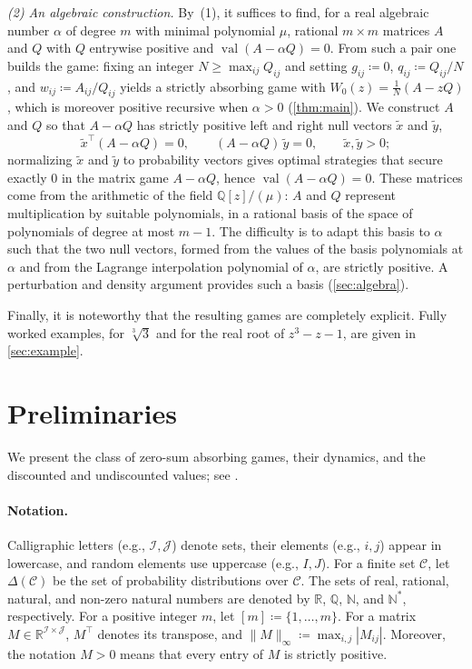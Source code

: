 \documentclass[11pt, a4paper]{article}
\theoremstyle{plain}
\theoremstyle{definition}
\newcommand{\Q}{\mathbb{Q}}
\newcommand{\R}{\mathbb{R}}
\newcommand{\N}{\mathbb{N}}
\DeclareMathOperator{\val}{val}
\newcommand{\defas}{\coloneqq}
\newcommand{\I}{\mathcal{I}}
\newcommand{\J}{\mathcal{J}}
\newcommand{\C}{\mathcal{C}}
\begin{document}
\emph{(2) An algebraic construction.}
By~(1), it suffices to find, for a real algebraic number $\alpha$ of degree $m$ with minimal polynomial $\mu$, rational $m\times m$ matrices $A$ and $Q$ with $Q$ entrywise positive and $\val(A-\alpha Q)=0$. From such a pair one builds the game: fixing an integer $N\geq\max_{ij}Q_{ij}$ and setting $g_{ij}\defas0$, $q_{ij}\defas Q_{ij}/N$, and $w_{ij}\defas A_{ij}/Q_{ij}$ yields a strictly absorbing game with $W_0(z)=\tfrac1N(A-zQ)$, which is moreover positive recursive when $\alpha>0$ (\cref{thm:main}). We construct $A$ and $Q$ so that $A-\alpha Q$ has strictly positive left and right null vectors $\tilde x$ and $\tilde y$,
\[
\tilde x^{\top}(A-\alpha Q)=0,
\qquad
(A-\alpha Q)\,\tilde y=0,
\qquad
\tilde x,\tilde y>0 ;
\]
normalizing $\tilde x$ and $\tilde y$ to probability vectors gives optimal strategies that secure exactly $0$ in the matrix game $A-\alpha Q$, hence $\val(A-\alpha Q)=0$.
These matrices come from the arithmetic of the field $\Q[z]/(\mu)$: $A$ and $Q$ represent multiplication by suitable polynomials, in a rational basis of the space of polynomials of degree at most $m-1$. The difficulty is to adapt this basis to $\alpha$ such that the two null vectors, formed from the values of the basis polynomials at $\alpha$ and from the Lagrange interpolation polynomial of $\alpha$, are strictly positive. A perturbation and density argument provides such a basis (\cref{sec:algebra}).

Finally, it is noteworthy that the resulting games are completely explicit. Fully worked examples, for $\sqrt[3]3$ and for the real root of $z^3-z-1$, are given in \cref{sec:example}.

\section{Preliminaries}\label{sec:prelim}

We present the class of zero-sum absorbing games, their dynamics, and the discounted and undiscounted values; see \citep{Koh74,OV23}.

\paragraph{Notation.}
Calligraphic letters (e.g., $\I,\J$) denote sets, their elements (e.g., $i,j$) appear in lowercase, and random elements use uppercase (e.g., $I,J$). 
For a finite set $\C$, let $\Delta(\C)$ be the set of probability distributions over $\C$. 
The sets of real, rational, natural, and non-zero natural numbers are denoted by $\R$, $\Q$, $\N$, and $\N^*$, respectively. 
For a positive integer $m$, let $[m] \defas \{1,\ldots,m\}$.
For a matrix $M\in\R^{\I\times\J}$, $M^\top$ denotes its transpose, and $\|M\|_\infty\defas\max_{i,j}|M_{ij}|$.
Moreover, the notation $M>0$ means that every entry of $M$ is strictly positive.
\end{document}
